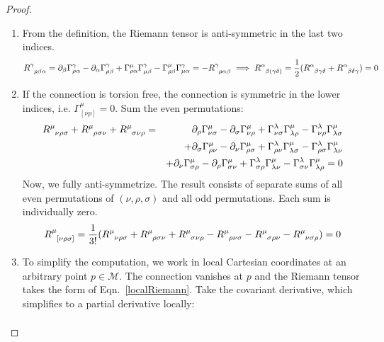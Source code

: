 \documentclass[a4paper]{article}
\theoremstyle{new}
\begin{document}
\begin{proof}\leavevmode
\begin{enumerate}
    \item From the definition, the Riemann tensor is anti-symmetric in the last two indices.
$$\tensor*{R}{*_{}^{\gamma}_{\rho\beta\alpha}}=\partial_\beta\Gamma_{\rho\alpha}^\gamma-\partial_\alpha\Gamma_{\rho\beta}^\gamma+\Gamma_{\rho\alpha}^\mu\Gamma_{\mu\beta}^\gamma-\Gamma_{\rho\beta}^\mu\Gamma_{\mu\alpha}^\gamma=-\tensor*{R}{*_{}^{\gamma}_{\rho\alpha\beta}}\implies\tensor*{R}{*_{}^{\alpha}_{\beta(\gamma\delta)}}=\frac{1}{2}(\tensor*{R}{*_{}^{\alpha}_{\beta\gamma\delta}}+\tensor*{R}{*_{}^{\alpha}_{\beta\delta\gamma}})=0$$
    \item If the connection is torsion free, the connection is symmetric in the lower indices, i.e. $\Gamma^\mu_{[\nu\rho]}=0$. Sum the even permutations:
    \begin{eqnarray}
    \tensor*{R}{*_{}^{\mu}_{\nu\rho\sigma}}+\tensor*{R}{*_{}^{\mu}_{\rho\sigma\nu}}+\tensor*{R}{*_{}^{\mu}_{\sigma\nu\rho}}&=&\partial_\rho\Gamma^\mu_{\nu\sigma}-\partial_\sigma\Gamma^\mu_{\nu\rho}+\Gamma^\lambda_{\nu\sigma}\Gamma^\mu_{\lambda\rho}-\Gamma^\lambda_{\nu\rho}\Gamma^\mu_{\lambda\sigma}\nonumber\\&&+\partial_\sigma\Gamma^\mu_{\rho\nu}-\partial_\nu\Gamma^\mu_{\rho\sigma}+\Gamma^\lambda_{\rho\nu}\Gamma^\mu_{\lambda\sigma}-\Gamma^\lambda_{\rho\sigma}\Gamma^\mu_{\lambda\nu}\nonumber\\&&+\partial_\nu\Gamma^\mu_{\sigma\rho}-\partial_\rho\Gamma^\mu_{\sigma\nu}+\Gamma^\lambda_{\sigma\rho}\Gamma^\mu_{\lambda\nu}-\Gamma^\lambda_{\sigma\nu}\Gamma^\mu_{\lambda\rho}=0\nonumber
    \end{eqnarray}
    Now, we fully anti-symmetrize. The result consists of separate sums of all even permutations of $(\nu,\rho,\sigma)$ and all odd permutations. Each sum is individually zero.
    $$\tensor*{R}{*_{}^{\mu}_{[\nu\rho\sigma]}}=\frac{1}{3!}(\tensor*{R}{*_{}^{\mu}_{\nu\rho\sigma}}+\tensor*{R}{*_{}^{\mu}_{\rho\sigma\nu}}+\tensor*{R}{*_{}^{\mu}_{\sigma\nu\rho}}-\tensor*{R}{*_{}^{\mu}_{\rho\nu\sigma}}-\tensor*{R}{*_{}^{\mu}_{\sigma\rho\nu}}-\tensor*{R}{*_{}^{\mu}_{\nu\sigma\rho}})=0$$
    \item To simplify the computation, we work in local Cartesian coordinates at an arbitrary point $p\in\mathcal{M}$. The connection vanishes at $p$ and the Riemann tensor takes the form of Eqn.~\ref{localRiemann}. Take the covariant derivative, which simplifies to a partial derivative locally:
    \begin{align}

\end{align}
\end{enumerate}
\end{proof}
\end{document}

